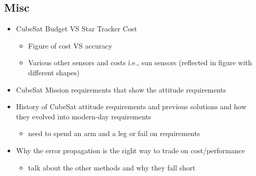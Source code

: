 \subsection*{Misc}
\begin{itemize}
    \item CubeSat Budget VS Star Tracker Cost \cite{SmallSatMarket}
    \begin{itemize}
        \item Figure of cost VS accuracy 
        \item Various other sensors and costs i.e., sun sensors (reflected in figure with different shapes)
    \end{itemize} 
    \item CubeSat Mission requirements that show the attitude requirements \cite{CubeSatCLICK, OnOrbitBeamCalibration} 
    \item History of CubeSat attitude requirements and previous solutions and how they evolved into modern-day requirements \cite{QuakeSat}
    \begin{itemize}
    \item need to spend an arm and a leg or fail on requirements 
    \end{itemize}
        \item Why the error propagation is the right way to trade on cost/performance 
    \begin{itemize}
        \item talk about the other methods and why they fall short  
    \end{itemize}
\end{itemize}

